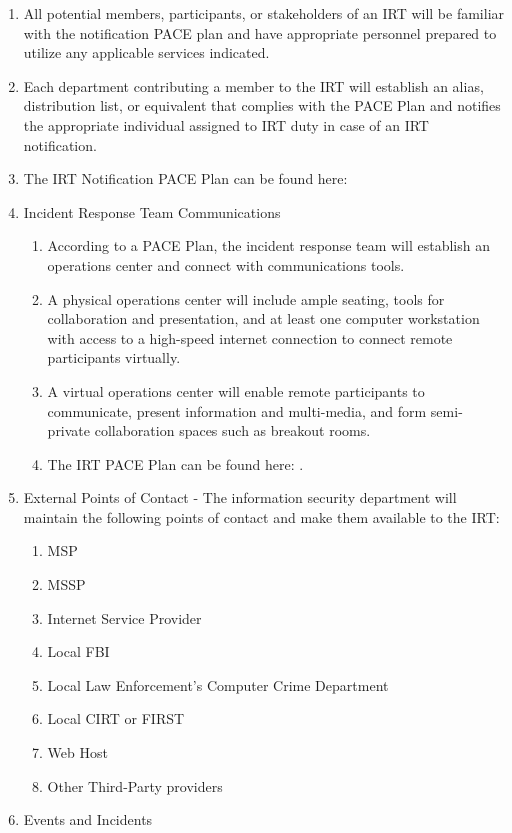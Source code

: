 \documentclass[../main.tex]{subfiles}
\begin{document}
\begin{enumerate}
    \item All potential members, participants, or stakeholders of an IRT will be familiar with the notification PACE plan and have appropriate personnel prepared to utilize any applicable
    services indicated.
    \item Each department contributing a member to the IRT will establish an alias, distribution list, or equivalent that complies with the PACE Plan and notifies the appropriate individual
    assigned to IRT duty in case of an IRT notification.
    \item The IRT Notification PACE Plan can be found here: \PacePlan{}
    \item Incident Response Team Communications
    \begin{enumerate}
        \item According to a PACE Plan, the incident response team will establish an operations center and connect with communications tools.
        \item A physical operations center will include ample seating, tools for collaboration and presentation, and at least one computer workstation with access to a high-speed internet
        connection to connect remote participants virtually.
        \item A virtual operations center will enable remote participants to communicate, present information and multi-media, and form semi-private collaboration spaces such as breakout rooms.
        \item The IRT PACE Plan can be found here: \PacePlan{}.
    \end{enumerate}
    \item 	External Points of Contact - The information security department will maintain the following points of contact and make them available to the IRT:
    \begin{enumerate}
        \item MSP
        \item MSSP
        \item Internet Service Provider
        \item Local FBI
        \item Local Law Enforcement's Computer Crime Department
        \item Local CIRT or FIRST
        \item Web Host
        \item Other Third-Party providers
    \end{enumerate}
    \item Events and Incidents

\end{enumerate}
\end{document}
